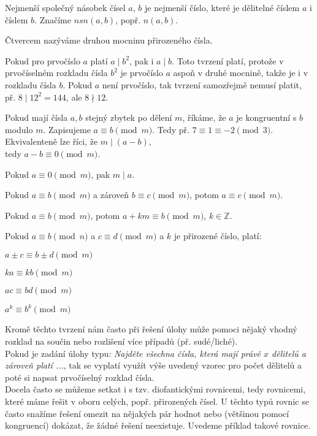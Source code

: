 \documentclass[12pt,a4paper]{report}
\begin{document}
\begin{description}
	\item Nejmenší společný násobek čísel $a$, $b$ je nejmenší číslo, které je dělitelné číslem $a$ i číslem $b$. Značíme $nsn(a,b)$, popř. $n(a,b)$.
	\item Čtvercem nazýváme druhou mocninu přirozeného čísla.
	\item Pokud pro prvočíslo $a$ platí $a \mid b^2$, pak i $a \mid b$. Toto tvrzení platí, protože v prvočíselném rozkladu čísla $b^2$ je prvočíslo $a$ aspoň v druhé mocnině, takže je i v rozkladu čísla $b$. Pokud $a$ není prvočíslo, tak tvrzení samozřejmě nemusí platit, př. $8 \mid 12^2=144$, ale $8 \nmid 12$.
	\item Pokud mají čísla $a, b$ stejný zbytek po dělení $m$, říkáme, že $a$ je kongruentní s $b$ modulo $m$. Zapisujeme $a \equiv b \pmod m$. Tedy př. $7 \equiv 1 \equiv -2 \pmod 3$. Ekvivalenteně lze říci, že $m \mid (a-b)$, \\tedy $a-b \equiv 0 \pmod m $.
	\item Pokud $a \equiv 0 \pmod m$, pak $m \mid a$.
	\item Pokud $a \equiv b \pmod m$ a zároveň $b \equiv c \pmod m$, potom $a \equiv c \pmod m$.
	\item Pokud $a \equiv b \pmod m$, potom $a +km \equiv b \pmod m$, $k \in \mathbb{Z} $.
	\item Pokud $a \equiv b \pmod n$ a $c \equiv d \pmod m$ a $k$ je přirozené číslo, platí:
	
	\begin{description}
		\item $a \pm c \equiv b \pm d \pmod m$
		\item $ka \equiv kb \pmod m$
		\item $ac \equiv bd \pmod m$
		\item $a^k \equiv b^k \pmod m$
	\end{description}
	
\end{description}
Kromě těchto tvrzení nám často při řešení úlohy může pomoci nějaký vhodný rozklad na součin nebo rozlišení více případů (př. sudé/liché).
\\Pokud je zadání úlohy typu: \textit{Najděte všechna čísla, která mají právě $x$ dělitelů a zároveň platí ...}, tak se vyplatí využít výše uvedený vzorec pro počet dělitelů a poté si napsat prvočíselný rozklad čísla. 
\\Docela často se můžeme setkat i s tzv. diofantickými rovnicemi, tedy rovnicemi, které máme řešit v oboru celých, popř. přirozených čísel. U těchto typů rovnic se často snažíme řešení omezit na nějakých pár hodnot nebo (většinou pomocí kongruencí) dokázat, že žádné řešení neexistuje. Uvedeme příklad takové rovnice.\\\\
\end{document}
